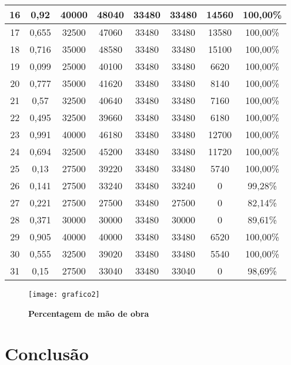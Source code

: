 \documentclass[11pt,a4paper]{report}
\begin{document}
\begin{table} [h]
\begin{center}
\begin{adjustbox}{width=1\textwidth,max totalheight=\textheight,keepaspectratio}
\begin{tabular} {|c|c|c|c|c|c|c|c|}
16 &	0,92 &	40000 &	48040 &	33480 &	33480 &	14560 &	100,00\%\\ \hline
17 &	0,655 &	32500 &	47060 &	33480 &	33480 &	13580 &	100,00\%\\ \hline
18 &	0,716 &	35000 &	48580 &	33480 &	33480 &	15100 &	100,00\%\\ \hline
19 &	0,099 &	25000 &	40100 &	33480 &	33480 &	6620 &	100,00\%\\ \hline
20 &	0,777 &	35000 &	41620 &	33480 &	33480 &	8140 &	100,00\%\\ \hline
21 &	0,57 &	32500 &	40640 &	33480 &	33480 &	7160 &	100,00\%\\ \hline
22 &	0,495 &	32500 &	39660 &	33480 &	33480 &	6180 &	100,00\%\\ \hline
23 &	0,991 &	40000 &	46180 &	33480 &	33480 &	12700 &	100,00\%\\ \hline
24 &	0,694 &	32500 &	45200 &	33480 &	33480 &	11720 &	100,00\%\\ \hline
25 &	0,13 &	27500 &	39220 &	33480 &	33480 &	5740 &	100,00\%\\ \hline
26 &	0,141 &	27500 &	33240 &	33480 &	33240 &	0 &	99,28\%\\ \hline
27 &	0,221 &	27500 &	27500 &	33480 &	27500 &	0 &	82,14\%\\ \hline
28 &	0,371 &	30000 &	30000 &	33480 &	30000 &	0 &	89,61\%\\ \hline
29 &	0,905 &	40000 &	40000 &	33480 &	33480 &	6520 &	100,00\%\\ \hline
30 &	0,555 &	32500 &	39020 &	33480 &	33480 &	5540 &	100,00\%\\ \hline
31 &	0,15 &	27500 &	33040 &	33480 &	33040 &	0 &	98,69\%\\
\hline 
\end{tabular}
\end{adjustbox}
\end{center}
\end{table}
\begin{figure} [h]
\begin{center}
\caption{\bf Percentagem de mão de obra}
\texttt{[image: grafico2]}
\end{center}
\label{figura1}
\end{figure}
\chapter{Conclusão}
\end{document}
